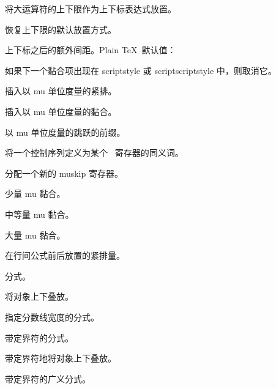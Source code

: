 \documentclass[a4paper]{rapport3}
\newenvironment{inventory}{\begin{description}}{\end{description}}
\begin{document}
\begin{inventory}
\item [] 
      将大运算符的上下限作为上下标表达式放置。

\item [] 
      恢复上下限的默认放置方式。

\item [] 
      上下标之后的额外间距。Plain \TeX\ 默认值：~\n{0.5pt}

\item [] 
      如果下一个黏合项出现在 scriptstyle 或 scriptscriptstyle 中，则取消它。

\item [] 
      插入以 mu 单位度量的紧排。

\item [] 
      插入以 mu 单位度量的黏合。

\item [] 
      以 mu 单位度量的跳跃的前缀。

\item [] 
      将一个控制序列定义为某个~ 寄存器的同义词。

\item [] 
      分配一个新的 muskip 寄存器。

\item [] 
      少量 mu 黏合。

\item [] 
      中等量 mu 黏合。

\item [] 
      大量 mu 黏合。

\item [] 
      在行间公式前后放置的紧排量。

\item []
      分式。

\item []
      将对象上下叠放。

\item []
      指定分数线宽度的分式。

\item []
      带定界符的分式。

\item []
      带定界符地将对象上下叠放。

\item []
      带定界符的广义分式。


\end{inventory}
\end{document}
